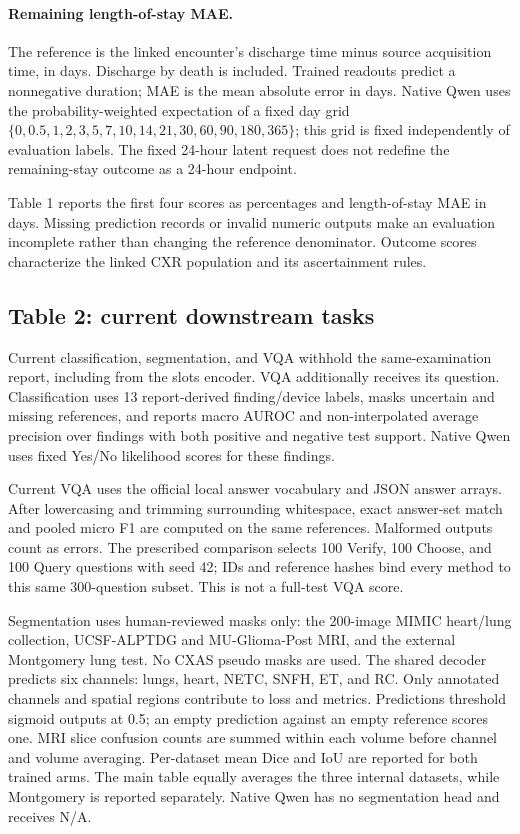 \paragraph{Remaining length-of-stay MAE.}
The reference is the linked encounter's discharge time minus source acquisition
time, in days. Discharge by death is included. Trained readouts predict a
nonnegative duration; MAE is the mean absolute error in days. Native Qwen uses
the probability-weighted expectation of a fixed day grid
$\{0,0.5,1,2,3,5,7,10,14,21,30,60,90,180,365\}$; this grid is fixed independently
of evaluation labels. The fixed 24-hour latent request does not redefine the
remaining-stay outcome as a 24-hour endpoint.

Table 1 reports the first four scores as percentages and length-of-stay MAE in
days. Missing prediction records or invalid numeric outputs make an evaluation
incomplete rather than changing the reference denominator. Outcome scores
characterize the linked CXR population and its ascertainment rules.

\subsection{Table 2: current downstream tasks}

Current classification, segmentation, and VQA withhold the same-examination
report, including from the slots encoder. VQA additionally receives its question.
Classification uses 13 report-derived finding/device labels, masks uncertain and
missing references, and reports macro AUROC and non-interpolated average
precision over findings with both positive and negative test support. Native
Qwen uses fixed Yes/No likelihood scores for these findings.

Current VQA uses the official local answer vocabulary and JSON answer arrays.
After lowercasing and trimming surrounding whitespace, exact answer-set match
and pooled micro F1 are computed on the same references. Malformed outputs count
as errors. The prescribed comparison selects 100 Verify, 100 Choose, and 100
Query questions with seed 42; IDs and reference hashes bind every method to this
same 300-question subset. This is not a full-test VQA score.

Segmentation uses human-reviewed masks only: the 200-image MIMIC heart/lung
collection, UCSF-ALPTDG and MU-Glioma-Post MRI, and the external Montgomery lung
test. No CXAS pseudo masks are used. The shared decoder predicts six channels:
lungs, heart, NETC, SNFH, ET, and RC. Only annotated channels and spatial regions
contribute to loss and metrics. Predictions threshold sigmoid outputs at 0.5;
an empty prediction against an empty reference scores one. MRI slice confusion
counts are summed within each volume before channel and volume averaging.
Per-dataset mean Dice and IoU are reported for both trained arms. The main table
equally averages the three internal datasets, while Montgomery is reported
separately. Native Qwen has no segmentation head and receives N/A.


